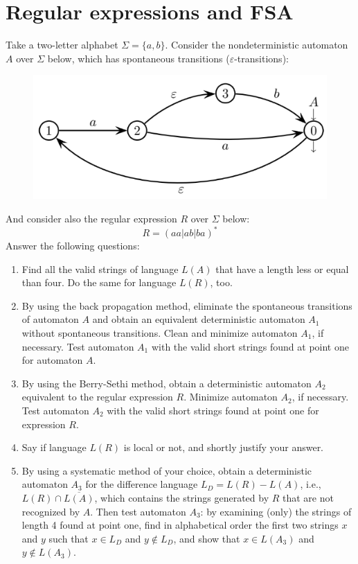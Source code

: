 \documentclass[12pt, a4paper]{report}
\newtheorem[style=M,bodystyle=\normalfont]{theorem}{Theorem}
\newtheorem[style=M,bodystyle=\normalfont]{corollary}{Corollary}
\newtheorem[style=M,bodystyle=\normalfont]{lemma}{Lemma}
\newtheorem[style=M,bodystyle=\normalfont]{definition}{Definition}
\begin{document}
    \section{Regular expressions and FSA}
        Take a two-letter alphabet $\Sigma=\{a,b\}$.  Consider the nondeterministic automaton $A$ over $\Sigma$ below, which has spontaneous transitions ($\varepsilon$-transitions): 
        \begin{figure}[H]
            \centering
            \includegraphics[width=0.5\linewidth]{images/FSA1a.png}
        \end{figure}
        And consider also the regular expression $R$ over $\Sigma$ below:
        \[R=\left( aa|ab|ba \right)^{*}\]
        Answer the following questions:
        \begin{enumerate}
            \item Find all the valid strings of language $L(A)$ that have a length less or equal than four. Do the same for language $L(R)$, too.
            \item By using the back propagation method, eliminate the spontaneous transitions of automaton $A$ and obtain an equivalent deterministic automaton $A_1$ without spontaneous transitions. 
                Clean and minimize automaton $A_1$, if necessary. Test automaton $A_1$ with the valid short strings found at point one for automaton $A$. 
            \item By using the Berry-Sethi method, obtain a deterministic automaton $A_2$ equivalent to the regular expression $R$. Minimize automaton $A_2$, if necessary. Test automaton $A_2$ with the valid short 
                strings found at point one for expression $R$.
            \item Say if language $L(R)$ is local or not, and shortly justify your answer.
            \item By using a systematic method of your choice, obtain a deterministic automaton $A_3$ for the difference language $L_D=L(R)-L(A)$, i.e., $L(R) \cap \overline{L(A)}$, which contains the strings generated 
                by $R$ that are not recognized by $A$. Then test automaton $A_3$: by examining (only) the strings of length 4 found at point one, find in alphabetical order the first two strings $x$ and $y$ such that
                $x \in L_D$ and $y \notin L_D$, and show that $x \in L(A_3)$ and $y \notin L(A_3)$.
        \end{enumerate}
\end{document}
